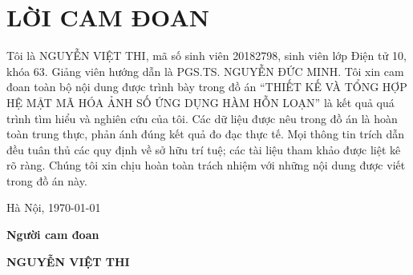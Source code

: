 \section*{LỜI CAM ĐOAN}
\thispagestyle{empty}
Tôi là NGUYỄN VIỆT THI, mã số sinh viên 20182798, sinh viên lớp Điện tử 10, khóa 63. Giảng viên hướng dẫn là PGS.TS. NGUYỄN ĐỨC MINH. Tôi xin cam đoan toàn bộ nội dung được trình bày trong đồ án “THIẾT KẾ VÀ TỔNG HỢP HỆ MẬT MÃ HÓA ẢNH SỐ ỨNG DỤNG HÀM HỖN LOẠN” là kết quả quá trình tìm hiểu và nghiên cứu của tôi. Các dữ liệu được nêu trong đồ án là hoàn toàn trung thực, phản ánh đúng kết quả đo đạc thực tế. Mọi thông tin trích dẫn đều tuân thủ các quy định về sở hữu trí tuệ; các tài liệu tham khảo được liệt kê rõ ràng. Chúng tôi xin chịu hoàn toàn trách nhiệm với những nội dung được viết trong đồ án này.

\vspace{6pt}
\hspace{8.3cm}Hà Nội, \today

\hspace{9cm}\textbf{Người cam đoan}

\vspace{2cm}
\hspace{9.25cm}\textbf{NGUYỄN VIỆT THI}
\cleardoublepage